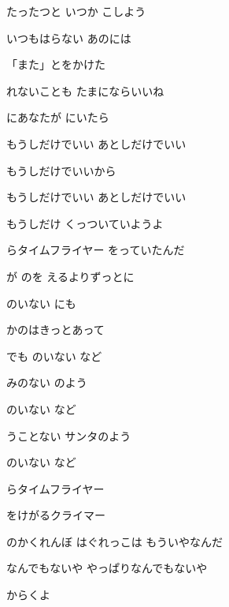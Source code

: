 \documentclass[14pt]{ltjsarticle}
\begin{document}
{  たったつと いつか こしよう
  \jisho{}

\item
  いつもはらない あのには
  \jisho{}

  「また」とをかけた
  \jisho{}

  れないことも たまにならいいね
  \jisho{}

  にあなたが にいたら
  \jisho{}

\item
  もうしだけでいい あとしだけでいい
  \jisho{}

  もうしだけでいいから
  \jisho{}

  もうしだけでいい あとしだけでいい
  \jisho{}

  もうしだけ くっついていようよ
  \jisho{}

\item
  らタイムフライヤー をっていたんだ
  \jisho{}

  が のを えるよりずっとに
  \jisho{}

\item
  のいない にも
  \jisho{}

  かのはきっとあって
  \jisho{}

  でも のいない など
  \jisho{}

  みのない のよう
  \jisho{}

  のいない など
  \jisho{}

  うことない サンタのよう
  \jisho{}

  のいない など
  \jisho{}

\item
  らタイムフライヤー
  \jisho{}

  をけがるクライマー
  \jisho{}

  のかくれんぼ はぐれっこは もういやなんだ
  \jisho{}

\item
  なんでもないや やっぱりなんでもないや
  \jisho{}

  からくよ
  \jisho{}

}
\end{document}
